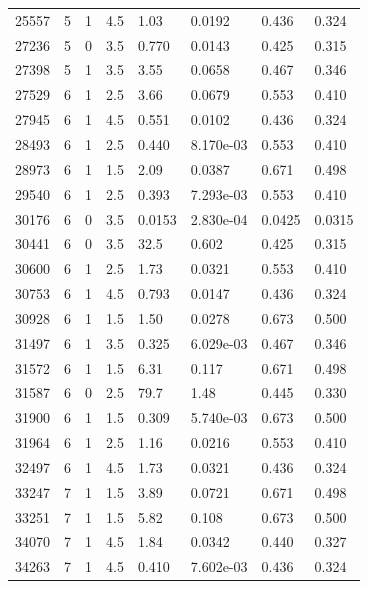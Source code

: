 \documentclass[preview]{standalone}
\begin{document}
{{{\begin{tabular}{L{1.2cm}C{1.2cm} C{0.3cm}C{0.5cm} C{1.4cm}C{1.4cm} C{1.4cm}C{1.4cm}}
  25557  &     5  & 1     & 4.5 &  1.03  & 0.0192  & 0.436 &  0.324   \\ 
  27236  &     5  & 0     & 3.5 &  0.770  & 0.0143  & 0.425 &  0.315   \\ 
  27398  &     5  & 1     & 3.5 &  3.55  & 0.0658  & 0.467 &  0.346   \\ 
  27529  &     6  & 1     & 2.5 &  3.66  & 0.0679  & 0.553 &  0.410   \\ 
  27945  &     6  & 1     & 4.5 &  0.551  & 0.0102  & 0.436 &  0.324   \\ 
  28493  &     6  & 1     & 2.5 &  0.440  & 8.170e-03  & 0.553 &  0.410   \\ 
  28973  &     6  & 1     & 1.5 &  2.09  & 0.0387  & 0.671 &  0.498   \\ 
  29540  &     6  & 1     & 2.5 &  0.393  & 7.293e-03  & 0.553 &  0.410   \\ 
  30176  &     6  & 0     & 3.5 &  0.0153  & 2.830e-04  & 0.0425 &  0.0315   \\ 
  30441  &     6  & 0     & 3.5 &  32.5  & 0.602  & 0.425 &  0.315   \\ 
  30600  &     6  & 1     & 2.5 &  1.73  & 0.0321  & 0.553 &  0.410   \\ 
  30753  &     6  & 1     & 4.5 &  0.793  & 0.0147  & 0.436 &  0.324   \\ 
  30928  &     6  & 1     & 1.5 &  1.50  & 0.0278  & 0.673 &  0.500   \\ 
  31497  &     6  & 1     & 3.5 &  0.325  & 6.029e-03  & 0.467 &  0.346   \\ 
  31572  &     6  & 1     & 1.5 &  6.31  & 0.117  & 0.671 &  0.498   \\ 
  31587  &     6  & 0     & 2.5 &  79.7  & 1.48  & 0.445 &  0.330   \\ 
  31900  &     6  & 1     & 1.5 &  0.309  & 5.740e-03  & 0.673 &  0.500   \\ 
  31964  &     6  & 1     & 2.5 &  1.16  & 0.0216  & 0.553 &  0.410   \\ 
  32497  &     6  & 1     & 4.5 &  1.73  & 0.0321  & 0.436 &  0.324   \\ 
  33247  &     7  & 1     & 1.5 &  3.89  & 0.0721  & 0.671 &  0.498   \\ 
  33251  &     7  & 1     & 1.5 &  5.82  & 0.108  & 0.673 &  0.500   \\ 
  34070  &     7  & 1     & 4.5 &  1.84  & 0.0342  & 0.440 &  0.327   \\ 
  34263  &     7  & 1     & 4.5 &  0.410  & 7.602e-03  & 0.436 &  0.324   \\ 

\end{tabular}}}}
\end{document}
